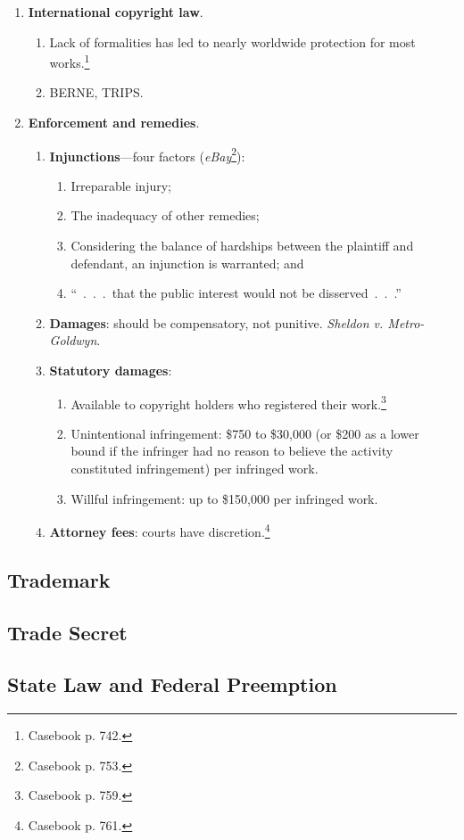 \begin{enumerate}
\begin{enumerate}
\begin{enumerate}
        \end{enumerate}
    \end{enumerate}
    \item \textbf{International copyright law}.
    \begin{enumerate}
        \item Lack of formalities has led to nearly worldwide protection for 
        most works.\footnote{Casebook p. 742.}
        \item BERNE, TRIPS.
    \end{enumerate}
    \item \textbf{Enforcement and remedies}.
    \begin{enumerate}
        \item \textbf{Injunctions}---four factors 
        (\emph{eBay}\footnote{Casebook p. 753.}):
        \begin{enumerate}
            \item Irreparable injury;
            \item The inadequacy of other remedies;
            \item Considering the balance of hardships between the plaintiff 
            and defendant, an injunction is warranted; and
            \item ``~.~.~.~that the public interest would not be 
            disserved~.~.~.''
        \end{enumerate}
        \item \textbf{Damages}: should be compensatory, not punitive.  
        \emph{Sheldon v. Metro-Goldwyn}.
        \item \textbf{Statutory damages}:
        \begin{enumerate}
            \item Available to copyright holders who registered their 
            work.\footnote{Casebook p. 759.}
            \item Unintentional infringement: \$750 to \$30,000 (or \$200 as a 
            lower bound if the infringer had no reason to believe the activity 
            constituted infringement) per infringed work.
            \item Willful infringement: up to \$150,000 per infringed work.
        \end{enumerate}
        \item \textbf{Attorney fees}: courts have 
        discretion.\footnote{Casebook p. 761.}
    \end{enumerate}
\end{enumerate}

\newpage

\subsection{Trademark}


\newpage

\subsection{Trade Secret}


\newpage

\subsection{State Law and Federal Preemption}
